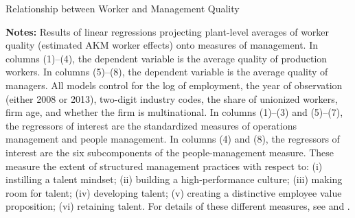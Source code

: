 \clearpage
\begin{landscape}
	\begin{table}
	\caption{Relationship between Worker and Management Quality} \label{tab:zpe_mgmt}
	\begin{center}
		\singlespace
		\small
		
	\end{center}
\footnotesize{\textbf{Notes:} Results of linear regressions projecting plant-level averages of worker quality (estimated AKM worker effects) onto measures of management. 
In columns (1)--(4), the dependent variable is the average quality of production workers.
In columns (5)--(8), the dependent variable is the average quality of managers.
All models control for the log of employment, the year of observation (either 2008 or 2013), two-digit industry codes, the share of unionized workers, firm age, and whether the firm is multinational. 
In columns (1)--(3) and (5)--(7), the regressors of interest are the standardized measures of operations management and people management. In columns (4) and (8), the regressors of interest are the six subcomponents of the people-management measure. These measure the extent of structured management practices with respect to: (i) instilling a talent mindset; (ii) building a high-performance culture; (iii) making room for talent; (iv) developing talent; (v) creating a distinctive employee value proposition; (vi) retaining talent. For details of these different measures, see \citet{bloom_qje2007} and \citet{wms_jeea}.}
	\end{table}
\end{landscape}




























